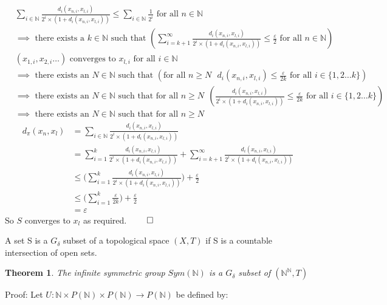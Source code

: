 \documentclass{report}
\newtheorem{theorem}{Theorem}[section]
\newenvironment{defn}[1][]{\refstepcounter{theorem}\begin{trivlist}
\item[\hskip \labelsep {\bfseries Definition  \thetheorem  \, \def\temp{#1}\ifx\temp\empty  #1\else  (#1)\fi
}]}   {\end{trivlist}}
\begin{document}
\begin{align*}
&\sum_{i\in \mathbb{N}}{\frac{d_i(x_{n,i},x_{l,i})}{2^i \times (1 + d_i(x_{n,i},x_{l,i}))}}\leq \sum_{i\in \mathbb{N}}\frac{1}{2^i}\text{ for all }n \in \mathbb{N}\\
&\implies\text{ there exists a }k\in \mathbb{N}\text{ such that }(\sum_{i=k+1}^{\infty}{\frac{d_i(x_{n,i},x_{l,i})}{2^i \times (1 + d_i(x_{n,i},x_{l,i}))}}\leq \frac{\varepsilon}{2}\text{ for all }n \in \mathbb{N})\\
&(x_{1,i}, x_{2,i} \ldots )\text{ converges to }x_{l,i}\text{ for all }i\in \mathbb{N}\\
&\implies\text{ there exists an }N \in \mathbb{N}\text{ such that 
}(\text{for all }n \geq N\ \ \ d_i (x_{n,i},x_{l,i}) \leq\frac{\varepsilon}{2k}\text{ for all }i \in \{1,2\ldots k\})\\
&\implies\text{ there exists an }N \in \mathbb{N}\text{ such that for all }n \geq N\ \ (\frac{d_i(x_{n,i},x_{l,i})}{2^i \times (1 + d_i(x_{n,i},x_{l,i}))} \leq \frac{\varepsilon}{2k}\text{ for all }i \in \{1,2\ldots k\})\\
&\implies\text{ there exists an }N \in \mathbb{N}\text{ such that for all }n \geq N
\end{align*}
\begin{align*}
d_\pi (x_n,x_l) &=\sum_{i\in \mathbb{N}}{\frac{d_i(x_{n,i},x_{l,i})}{2^i \times (1 + d_i(x_{n,i},x_{l,i}))}}\\
&=\sum_{i=1}^{k}{\frac{d_i(x_{n,i},x_{l,i})}{2^i \times (1 + d_i(x_{n,i},x_{l,i}))}}+\sum_{i = k+1}^{\infty}{\frac{d_i(x_{n,i},x_{l,i})}{2^i \times (1 + d_i(x_{n,i},x_{l,i}))}}\\
&\leq\Big( \sum_{i=1}^{k}{\frac{d_i(x_{n,i},x_{l,i})}{2^i \times (1 + d_i(x_{n,i},x_{l,i}))}}\Big) +\frac{\varepsilon}{2}\\
&\leq\Big( \sum_{i=1}^{k}{\frac{\varepsilon}{2k}}\Big) +\frac{\varepsilon}{2}\\
&= \varepsilon
\end{align*} 
So $S$ converges to $x_l$ as required. $\qed$
\begin{defn}
A set S is a $G_\delta$ subset of a topological space $(X,T)$ if S is a countable intersection of open sets.
\end{defn}
\begin{theorem}\label{Sym G-delta}
The infinite symmetric group $Sym(\mathbb{N})$ is a $G_\delta$ subset of $(\mathbb{N}^\mathbb{N},T)$ 
\end{theorem}\par
Proof: Let $U:\mathbb{N}\times P(\mathbb{N})\times P(\mathbb{N})\rightarrow P(\mathbb{N})$ be defined by:
\end{document}
